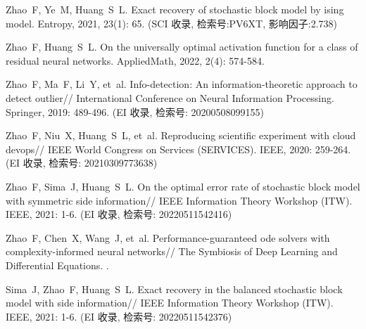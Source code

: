 \begin{resume}
  \begin{achievements}
    \item Zhao~F, Ye~M, Huang~S~L.
    \newblock Exact recovery of stochastic block model by ising
      model\allowbreak[J].
    \newblock Entropy, 2021{}, 23\allowbreak (1): 65.
    (SCI 收录, 检索号:PV6XT, 影响因子:2.738)
    \item Zhao~F, Huang~S~L.
    \newblock On the universally optimal activation function for a class of
      residual neural networks\allowbreak[J].
    \newblock AppliedMath, 2022, 2\allowbreak (4): 574-584.
    \item Zhao~F, Ma~F, Li~Y, et~al.
    \newblock Info-detection: An information-theoretic approach to detect
      outlier\allowbreak[C]//\allowbreak
    International Conference on Neural Information Processing.
    \newblock Springer, 2019: 489-496.
    (EI 收录, 检索号: 20200508099155)
    \item Zhao~F, Niu~X, Huang~S~L, et~al.
    \newblock Reproducing scientific experiment with cloud
      devops\allowbreak[C]// IEEE World Congress on Services (SERVICES).
    \newblock IEEE, 2020: 259-264.
    (EI 收录, 检索号: 20210309773638)
    \item Zhao~F, Sima~J, Huang~S~L.
    \newblock On the optimal error rate of stochastic block model with symmetric
      side information\allowbreak[C]// IEEE Information Theory Workshop (ITW).
    \newblock IEEE, 2021{}: 1-6.
    (EI 收录, 检索号: 20220511542416)
    \item Zhao~F, Chen~X, Wang~J, et~al.
    \newblock Performance-guaranteed ode solvers with complexity-informed neural
      networks\allowbreak[C]//\allowbreak
    The Symbiosis of Deep Learning and Differential Equations.
    .
    \item Sima~J, Zhao~F, Huang~S~L.
    \newblock Exact recovery in the balanced stochastic block model with side
      information\allowbreak[C]// IEEE Information Theory Workshop (ITW).
    \newblock IEEE, 2021: 1-6.
    (EI 收录, 检索号: 20220511542376)
  \end{achievements}




\end{resume}
